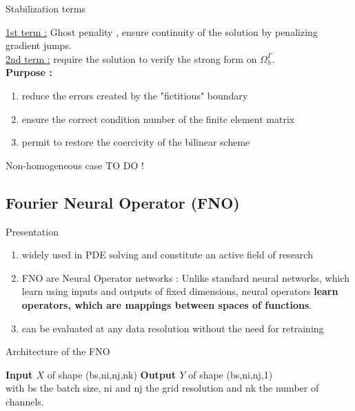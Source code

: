 \documentclass[compress,10pt,xcolor={table,dvipsnames},t]{beamer}
\begin{document}
	\begin{frame}{Stabilization terms}
		\begin{center}
			\centering
		\end{center}
		\small
		\underline{1st term :} Ghost penality \cite{burman_ghost_2010}, ensure continuity of the solution by penalizing gradient jumps. \\
		\underline{2nd term :} require the solution to verify the strong form on $\Omega_h^\Gamma$. \\
		\normalsize
		\textbf{Purpose :} 
		\begin{enumerate}[\ding{217}]
			\item reduce the errors created by the "fictitious" boundary 
			\item ensure the correct condition number of the finite element matrix
			\item permit to restore the coercivity of the bilinear scheme
		\end{enumerate}
	\end{frame}

	\begin{frame}{Non-homogeneous case}
		TO DO !
	\end{frame}

	\subsection{Fourier Neural Operator (FNO)}
	
	\begin{frame}{Presentation}
		\begin{enumerate}[\ding{217}]
			\item widely used in PDE solving and constitute an active field of research
			\item FNO are Neural Operator networks : Unlike standard neural networks, which learn using inputs and outputs of fixed dimensions, neural operators \textbf{learn operators, which are mappings between spaces of functions}. \item can be evaluated at any data resolution without the need for retraining
		\end{enumerate}
	\end{frame}

	\begin{frame}{Architecture of the FNO}
		\begin{center}
			\centering
		\end{center}
		\textbf{Input $X$} of shape (bs,ni,nj,nk) \qquad \qquad \textbf{Output $Y$} of shape (bs,ni,nj,1) \\
		with bs the batch size, ni and nj the grid resolution and nk the number of channels.
	\end{frame}
\end{document}
